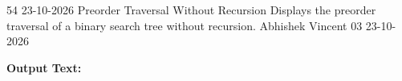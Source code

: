 \clearpage
\label{prog:54}
\programhead
  {54}
  {23-10-2026}
  {Preorder Traversal Without Recursion}
  {Displays the preorder traversal of a binary search tree without recursion.}
  {Abhishek Vincent}
  {03}
  {23-10-2026}

\divider
\textbf{Output Text:}\par
\vspace{2pt}

